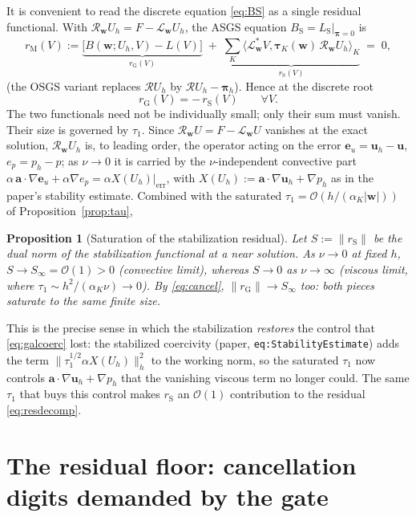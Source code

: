 \documentclass[11pt]{article}
\newcommand{\bu}{\boldsymbol{u}}
\newcommand{\buh}{\boldsymbol{u}_h}
\newcommand{\bw}{\boldsymbol{w}}
\newcommand{\ba}{\boldsymbol{a}}
\newcommand{\Lop}{\mathcal{L}}
\newcommand{\Ladj}{\mathcal{L}^{*}}
\newcommand{\Rop}{\mathcal{R}}
\newcommand{\tauK}{\boldsymbol{\tau}_K}
\newcommand{\BS}{B_{\mathrm S}}
\newcommand{\LS}{L_{\mathrm S}}
\newcommand{\rG}{r_{\mathrm{G}}}
\newcommand{\rS}{r_{\mathrm{S}}}
\newcommand{\rM}{r_{\mathrm{M}}}
\newcommand{\grad}{\nabla}
\newcommand{\bigOh}{\mathcal{O}}
\newcommand{\innerK}[2]{\langle #1, #2\rangle_K}
\newtheorem{proposition}{Proposition}
\begin{document}
It is convenient to read the discrete equation \eqref{eq:BS} as a single residual
functional. With $\Rop_{\bw}U_h=F-\Lop_{\bw}U_h$, the ASGS equation
$\BS=\LS|_{\boldsymbol\pi=0}$ is
\begin{equation}
  \rM(V):=\underbrace{\big[B(\bw;U_h,V)-L(V)\big]}_{\textstyle \rG(V)}
  \;+\;\underbrace{\sum_K\innerK{\Ladj_{\bw}V}{\tauK(\bw)\,\Rop_{\bw}U_h}}_{\textstyle \rS(V)}
  \;=\;0 ,
  \label{eq:resdecomp}
\end{equation}
(the OSGS variant replaces $\Rop U_h$ by $\Rop U_h-\boldsymbol\pi_h$). Hence at the
discrete root
\begin{equation}
  \rG(V)=-\,\rS(V)\qquad\forall V .
  \label{eq:cancel}
\end{equation}
The two functionals need not be individually small; only their sum must vanish.
Their size is governed by $\tau_1$. Since $\Rop_{\bw}U=F-\Lop_{\bw}U$ vanishes at
the exact solution, $\Rop_{\bw}U_h$ is, to leading order, the operator acting on
the error $\boldsymbol e_u=\buh-\bu$, $e_p=p_h-p$; as $\nu\to0$ it is carried by
the $\nu$-independent convective part $\alpha\,\ba\!\cdot\!\grad\boldsymbol e_u
+\alpha\grad e_p=\alpha X(U_h)|_{\mathrm{err}}$, with $X(U_h):=\ba\!\cdot\!\grad\buh
+\grad p_h$ as in the paper's stability estimate. Combined with the saturated
$\tau_1=\bigOh(h/(\alpha_K|\bw|))$ of Proposition~\ref{prop:tau},

\begin{proposition}[Saturation of the stabilization residual]\label{prop:rS}
Let $S:=\|\rS\|$ be the dual norm of the stabilization functional at a near
solution. As $\nu\to0$ at fixed $h$, $S\to S_\infty=\bigOh(1)>0$
(convective limit), whereas $S\to0$ as $\nu\to\infty$ (viscous limit, where
$\tau_1\sim h^2/(\alpha_K\nu)\to0$). By \eqref{eq:cancel}, $\|\rG\|\to S_\infty$
too: \emph{both} pieces saturate to the same finite size.
\end{proposition}

This is the precise sense in which the stabilization \emph{restores} the control
that \eqref{eq:galcoerc} lost: the stabilized coercivity (paper,
\texttt{eq:StabilityEstimate}) adds the term
$\|\tau_1^{1/2}\alpha X(U_h)\|_h^2$ to the working norm, so the saturated $\tau_1$
now controls $\ba\!\cdot\!\grad\buh+\grad p_h$ that the vanishing viscous term no
longer could. The same $\tau_1$ that buys this control makes $\rS$ an
$\bigOh(1)$ contribution to the residual \eqref{eq:resdecomp}.

\section{The residual floor: cancellation digits demanded by the gate}\label{sec:floor}
\end{document}
